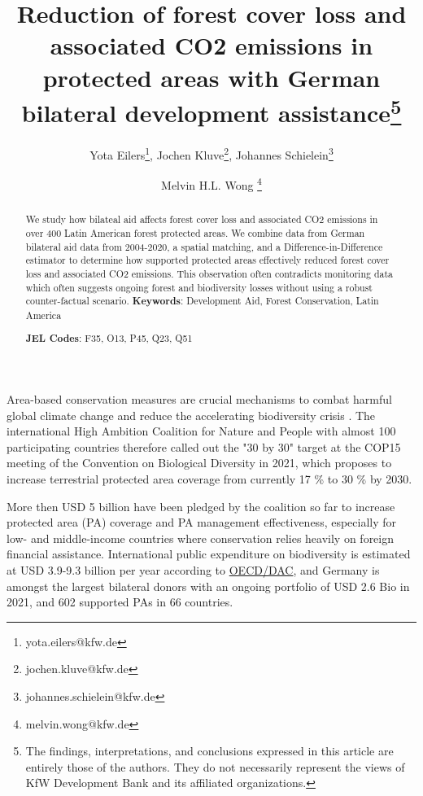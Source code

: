 \documentclass{article}
\title{Reduction of forest cover loss and associated CO2 emissions in protected areas with German bilateral development assistance\thanks{The findings, interpretations, and conclusions expressed in this article are entirely those of the authors. They do not necessarily represent the views of KfW Development Bank and its affiliated organizations.}}
\author{Yota Eilers\thanks{yota.eilers@kfw.de}, Jochen Kluve\thanks{jochen.kluve@kfw.de}, Johannes Schielein\thanks{johannes.schielein@kfw.de} \and Melvin H.L. Wong \thanks{melvin.wong@kfw.de}}
\begin{document}

\maketitle
\begin{abstract}
We study how bilateal aid affects forest cover loss and associated CO2 emissions in over 400 Latin American forest protected areas. We combine data from German bilateral aid data from 2004-2020, a spatial matching, and a Difference-in-Difference estimator to determine how supported protected areas effectively reduced forest cover loss and associated CO2 emissions. This observation often contradicts monitoring data which often suggests ongoing forest and biodiversity losses without using a robust counter-factual scenario.
                               \vspace{0.5cm}
                               \noindent\textbf{Keywords}: Development Aid, Forest Conservation, Latin America%
                               
                               \textbf{JEL Codes}: F35, O13, P45, Q23, Q51
                               
                               \vspace{0.5cm}
                \end{abstract}
                
                
                


Area-based conservation measures are crucial mechanisms to combat harmful global climate change and reduce the accelerating biodiversity crisis \citep{shukla2019climate, diaz2019global}. The international  High Ambition Coalition for Nature and People with almost 100 participating countries therefore called out the "30 by 30" target at the COP15 meeting of the Convention on Biological Diversity in 2021, which proposes to increase terrestrial protected area coverage from currently 17 \% to 30 \% by 2030.

More then USD 5 billion have been pledged by the coalition so far to increase protected area (PA) coverage and PA management effectiveness, especially for low- and middle-income countries where conservation relies heavily on foreign financial assistance. International public expenditure on biodiversity is estimated at USD 3.9-9.3 billion per year according to \href{https://www.oecd.org/environment/resources/biodiversity/report-a-comprehensive-overview-of-global-biodiversity-finance.pdf}{OECD/DAC}, and Germany is amongst the largest bilateral donors with an ongoing portfolio of USD 2.6 Bio in 2021, and 602 supported PAs in 66 countries.
\end{document}

